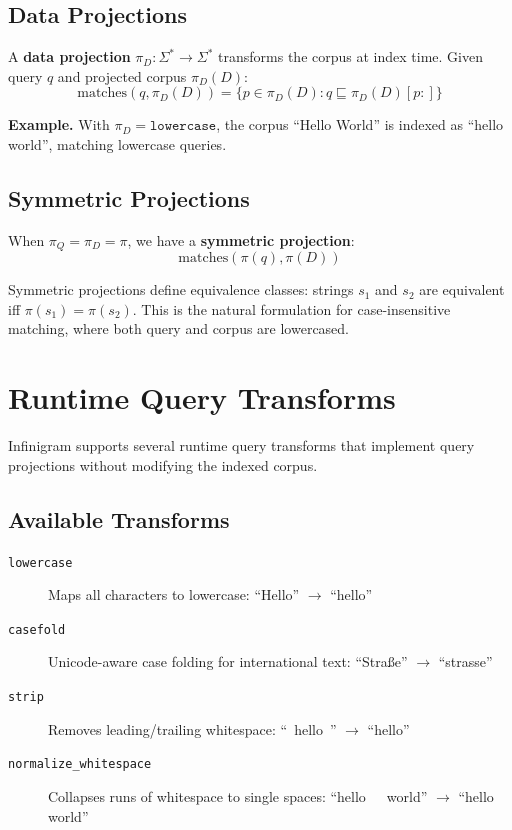 \documentclass[11pt]{article}
\begin{document}
\subsection{Data Projections}

A \textbf{data projection} $\pi_D: \Sigma^* \to \Sigma^*$ transforms the corpus at index time. Given query $q$ and projected corpus $\pi_D(D)$:
\begin{equation}
\text{matches}(q, \pi_D(D)) = \{p \in \pi_D(D) : q \sqsubseteq \pi_D(D)[p:]\}
\end{equation}

\textbf{Example.} With $\pi_D = \texttt{lowercase}$, the corpus ``Hello World'' is indexed as ``hello world'', matching lowercase queries.

\subsection{Symmetric Projections}

When $\pi_Q = \pi_D = \pi$, we have a \textbf{symmetric projection}:
\begin{equation}
\text{matches}(\pi(q), \pi(D))
\end{equation}

Symmetric projections define equivalence classes: strings $s_1$ and $s_2$ are equivalent iff $\pi(s_1) = \pi(s_2)$. This is the natural formulation for case-insensitive matching, where both query and corpus are lowercased.

\section{Runtime Query Transforms}

Infinigram supports several runtime query transforms that implement query projections without modifying the indexed corpus.

\subsection{Available Transforms}

\begin{description}
    \item[\texttt{lowercase}] Maps all characters to lowercase: ``Hello'' $\to$ ``hello''

    \item[\texttt{casefold}] Unicode-aware case folding for international text: ``Stra{\ss}e'' $\to$ ``strasse''

    \item[\texttt{strip}] Removes leading/trailing whitespace: ``\ hello\ '' $\to$ ``hello''

    \item[\texttt{normalize\_whitespace}] Collapses runs of whitespace to single spaces: ``hello\ \ \ world'' $\to$ ``hello world''
\end{description}
\end{document}
